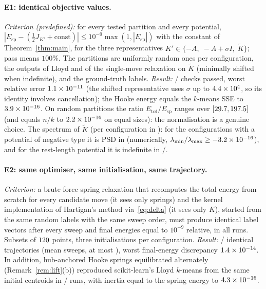 \documentclass[11pt,a4paper]{article}
\theoremstyle{plain}
\theoremstyle{definition}
\theoremstyle{remark}
\newcommand{\spec}{\mathrm{sp}}
\newcommand{\tot}{\mathrm{tot}}
\begin{document}
\paragraph{E1: identical objective values.} \emph{Criterion (predefined):} for every tested partition and every potential, $|E_\spec-(\tfrac12J_{K'}+\mathrm{const})|\le10^{-9}\max(1,|E_\spec|)$ with the constant of Theorem~\ref{thm:main}, for the three representatives $K'\in\{-A,\;-A+\sigma I,\;\widetilde K\}$; pass means $100\%$. The partitions are \EoneRandomPartitions{} uniformly random ones per configuration, the outputs of Lloyd and of the single-move relaxation on $\widetilde K$ (minimally shifted when indefinite), and the ground-truth labels. \emph{Result:} \EonePassed/\EoneChecks{} checks passed, worst relative error $1.1\times 10^{-11}$ (the shifted representative uses $\sigma$ up to $4.4\times 10^{4}$, so its identity involves cancellation); the Hooke energy equals the $k$-means SSE to $3.9\times 10^{-16}$. On random partitions the ratio $E_\tot/E_\spec$ ranges over $[29.7,197.5]$ (and equals $n/k$ to $2.2\times 10^{-16}$ on equal sizes): the normalisation is a genuine choice. The spectrum of $\widetilde K$ (per configuration in ): for the \EoneCndConfigs{} configurations with a potential of negative type it is PSD in \EoneCndPsd{} (numerically, $\lambda_{\min}/\lambda_{\max}\ge-3.2\times 10^{-16}$), and for the rest-length potential it is indefinite in \EoneRestIndefinite/\EoneRestConfigs.

\paragraph{E2: same optimiser, same initialisation, same trajectory.} \emph{Criterion:} a brute-force spring relaxation that recomputes the total energy from scratch for every candidate move (it sees only springs) and the kernel implementation of Hartigan's method via~\eqref{eq:delta} (it sees only $K$), started from the same random labels with the same sweep order, must produce identical label vectors after every sweep and final energies equal to $10^{-9}$ relative, in all runs. Subsets of $120$ points, three initialisations per configuration. \emph{Result:} \EtwoIdentical/\EtwoRuns{} identical trajectories (mean \EtwoMeanSweeps{} sweeps, at most \EtwoMaxSweeps), worst final-energy discrepancy $1.4\times 10^{-14}$. In addition, hub-anchored Hooke springs equilibrated alternately (Remark~\ref{rem:lift}(b)) reproduced scikit-learn's Lloyd $k$-means from the same initial centroids in \EtwoAnchoredIdentical/\EtwoAnchoredRuns{} runs, with inertia equal to the spring energy to $4.3\times 10^{-16}$.
\end{document}
